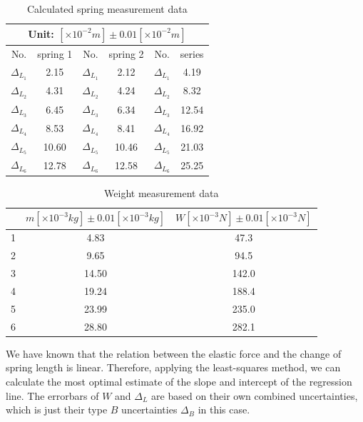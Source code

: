     \begin{table}[htbp]
        \centering
        \begin{tabular}{|c|c|c|c|c|c|}
            \hline
            \multicolumn{6}{|c|}{Unit: $[\times 10^{-2}m]\pm 0.01[\times 10^{-2}m]$}\\ \hline
            No. & spring 1 & No. & spring 2 & No. & series\\ \hline
            $\Delta_{L_1}$ & 2.15 & $\Delta_{L_1}$ & 2.12 & $\Delta_{L_1}$ & 4.19\\ \hline
            $\Delta_{L_2}$ & 4.31 & $\Delta_{L_2}$ & 4.24 & $\Delta_{L_2}$ & 8.32\\ \hline
            $\Delta_{L_3}$ & 6.45 & $\Delta_{L_3}$ & 6.34 & $\Delta_{L_3}$ & 12.54\\ \hline
            $\Delta_{L_4}$ & 8.53 & $\Delta_{L_4}$ & 8.41 & $\Delta_{L_4}$ & 16.92\\ \hline
            $\Delta_{L_5}$ & 10.60 & $\Delta_{L_5}$ & 10.46 & $\Delta_{L_5}$ & 21.03\\ \hline
            $\Delta_{L_6}$ & 12.78 & $\Delta_{L_6}$ & 12.58 & $\Delta_{L_6}$ & 25.25\\ \hline
        \end{tabular}
        \caption{Calculated spring measurement data}\label{spring*}
    \end{table}
    \begin{table}[htbp]
        \centering
        \begin{tabular}{|c|c|c|}
            \hline
            & $m[\times 10^{-3}kg]\pm 0.01[\times 10^{-3}kg]$ & $W[\times 10^{-3}N]\pm 0.01[\times 10^{-3}N]$\\ \hline
            1 & 4.83 & 47.3\\ \hline
            2 & 9.65 & 94.5\\ \hline
            3 & 14.50 & 142.0\\ \hline
            4 & 19.24 & 188.4\\ \hline
            5 & 23.99 & 235.0\\ \hline
            6 & 28.80 & 282.1\\ \hline            
        \end{tabular}
        \caption{Weight measurement data}\label{weight}
    \end{table}
    We have known that the relation between the elastic force and the change of spring length is linear. Therefore, applying the least-squares method, we can calculate the most optimal estimate of the slope and intercept of the regression line. The errorbars of $W$ and $\Delta_L$ are based on their own combined uncertainties, which is just their type $B$ uncertainties $\Delta_B$ in this case.\\
